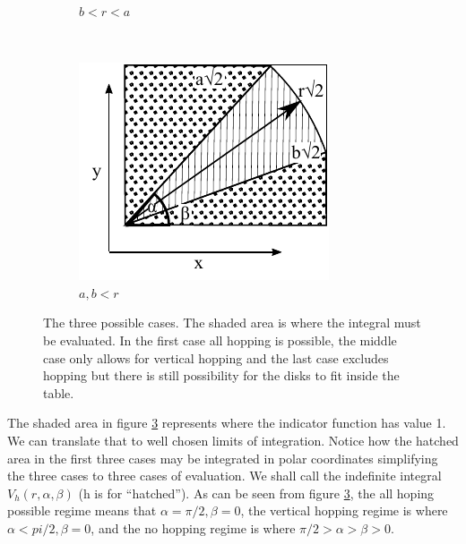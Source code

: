\documentclass[letterpaper,10pt, jcp, aps]{revtex4-1}
\begin{document}
\begin{figure}[h]
\begin{subfigure}[b]{0.32\textwidth}
          \caption{$b<r<a$}
          \label{Caso2}
        \end{subfigure}%
        ~ %
        \begin{subfigure}[b]{0.32\textwidth}
          \centering
          \includegraphics[width=\textwidth]{FigurasPerfectas/DiagramaIntegraCaso3.pdf}
          \caption{$a,b<r$}
          \label{Caso3}
        \end{subfigure}%
        \caption{The three possible cases. The shaded area is where the integral
          must be evaluated. In the first case all hopping is possible, the middle case
          only allows for vertical hopping and the last case excludes hopping but there
        is still possibility for the disks to fit inside the table.}
\label{CasosIntegra}
\end{figure}
The shaded area in figure \ref{CasosIntegra} represents where the indicator function
has value 1. We can translate that to well chosen limits of integration. Notice
how the hatched area in the first three cases may be integrated in polar coordinates
simplifying the three cases to three cases of evaluation. We shall call the
indefinite integral $V_h(r,\alpha,\beta)$ (h is for ``hatched'').
As can be seen from figure \ref{CasosIntegra}, the all hoping possible regime
means that $\alpha=\pi/2, \beta=0$, the vertical hopping regime is where
$\alpha<pi/2, \beta=0$, and the no hopping regime is where $\pi/2>\alpha>\beta>0$.
\end{document}
